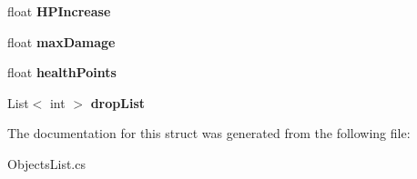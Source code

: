 \begin{DoxyCompactItemize}
float {\bfseries H\+P\+Increase}
\item 
\mbox{\label{struct_roguelike_r_p_g_1_1_object_data_a19b60f59f09b33a4f7cc260d128cb9a2}} 
float {\bfseries max\+Damage}
\item 
\mbox{\label{struct_roguelike_r_p_g_1_1_object_data_a8b833499f8c80e06929f5f8ae4b94bf9}} 
float {\bfseries health\+Points}
\item 
\mbox{\label{struct_roguelike_r_p_g_1_1_object_data_af9266c1c10aa8f0d4b1c1b17a11dadb2}} 
List$<$ int $>$ {\bfseries drop\+List}
\end{DoxyCompactItemize}


The documentation for this struct was generated from the following file\+:\begin{DoxyCompactItemize}
\item 
Objects\+List.\+cs\end{DoxyCompactItemize}
